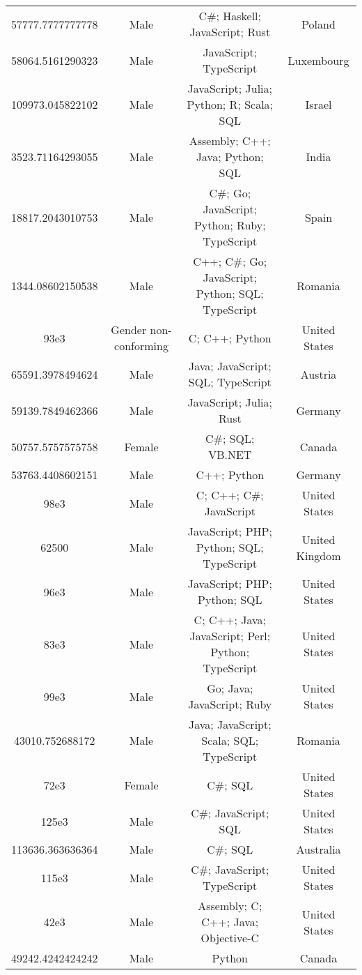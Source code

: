 \begin{center}
\begin{tabular}{ |c|c|c|c| }
57777.7777777778  &  Male  &  C\#; Haskell; JavaScript; Rust  &  Poland  \\ 
58064.5161290323  &  Male  &  JavaScript; TypeScript  &  Luxembourg  \\ 
109973.045822102  &  Male  &  JavaScript; Julia; Python; R; Scala; SQL  &  Israel  \\ 
3523.71164293055  &  Male  &  Assembly; C++; Java; Python; SQL  &  India  \\ 
18817.2043010753  &  Male  &  C\#; Go; JavaScript; Python; Ruby; TypeScript  &  Spain  \\ 
1344.08602150538  &  Male  &  C++; C\#; Go; JavaScript; Python; SQL; TypeScript  &  Romania  \\ 
93e3  &  Gender non-conforming  &  C; C++; Python  &  United States  \\ 
65591.3978494624  &  Male  &  Java; JavaScript; SQL; TypeScript  &  Austria  \\ 
59139.7849462366  &  Male  &  JavaScript; Julia; Rust  &  Germany  \\ 
50757.5757575758  &  Female  &  C\#; SQL; VB.NET  &  Canada  \\ 
53763.4408602151  &  Male  &  C++; Python  &  Germany  \\ 
98e3  &  Male  &  C; C++; C\#; JavaScript  &  United States  \\ 
62500  &  Male  &  JavaScript; PHP; Python; SQL; TypeScript  &  United Kingdom  \\ 
96e3  &  Male  &  JavaScript; PHP; Python; SQL  &  United States  \\ 
83e3  &  Male  &  C; C++; Java; JavaScript; Perl; Python; TypeScript  &  United States  \\ 
99e3  &  Male  &  Go; Java; JavaScript; Ruby  &  United States  \\ 
43010.752688172  &  Male  &  Java; JavaScript; Scala; SQL; TypeScript  &  Romania  \\ 
72e3  &  Female  &  C\#; SQL  &  United States  \\ 
125e3  &  Male  &  C\#; JavaScript; SQL  &  United States  \\ 
113636.363636364  &  Male  &  C\#; SQL  &  Australia  \\ 
115e3  &  Male  &  C\#; JavaScript; TypeScript  &  United States  \\ 
42e3  &  Male  &  Assembly; C; C++; Java; Objective-C  &  United States  \\ 
49242.4242424242  &  Male  &  Python  &  Canada  \\ 

\end{tabular}
\end{center}
